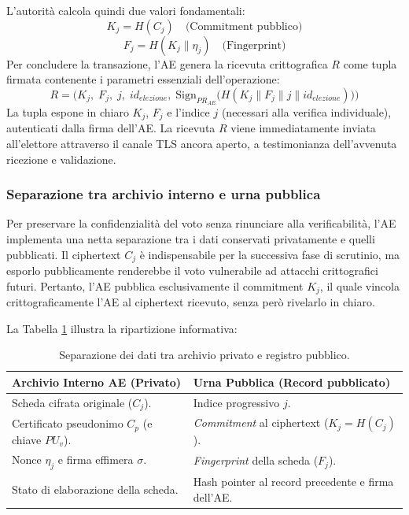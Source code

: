 L'autorità calcola quindi due valori fondamentali:
$$K_j = H(C_j) \quad \text{(Commitment pubblico)}$$
$$F_j = H(K_j \parallel \eta_j) \quad \text{(Fingerprint)}$$
Per concludere la transazione, l'AE genera la ricevuta crittografica $R$ come tupla firmata contenente i parametri essenziali dell'operazione:
$$R = \bigl(K_j,\; F_j,\; j,\; id_{elezione},\;
    \text{Sign}_{PR_{AE}}\!\bigl(H(K_j \parallel F_j \parallel j \parallel id_{elezione})\bigr)\bigr)$$
La tupla espone in chiaro $K_j$, $F_j$ e l'indice $j$ (necessari alla verifica individuale), autenticati dalla firma dell'AE. La ricevuta $R$ viene immediatamente inviata all'elettore attraverso il canale TLS ancora aperto, a testimonianza dell'avvenuta ricezione e validazione.

\subsubsection{Separazione tra archivio interno e urna pubblica}
\label{subsubsec:wp2_archivio_vs_urna}

Per preservare la confidenzialità del voto senza rinunciare alla verificabilità, l'AE implementa una netta separazione tra i dati conservati privatamente e quelli pubblicati. 
Il ciphertext $C_j$ è indispensabile per la successiva fase di scrutinio, ma esporlo pubblicamente renderebbe il voto vulnerabile ad attacchi crittografici futuri. Pertanto, l'AE pubblica esclusivamente il commitment $K_j$, il quale vincola crittograficamente l'AE al ciphertext ricevuto, senza però rivelarlo in chiaro.

La Tabella \ref{tab:separazione_dati} illustra la ripartizione informativa:

\begin{table}[H]
\centering
\renewcommand{\arraystretch}{1.3}
\begin{tabular}{|p{7cm}|p{7.5cm}|}
\hline
\textbf{Archivio Interno AE (Privato)} & \textbf{Urna Pubblica (Record pubblicato)} \\ \hline
Scheda cifrata originale ($C_j$). & Indice progressivo $j$. \\ \hline
Certificato pseudonimo $C_p$ (e chiave $PU_v$). & \textit{Commitment} al ciphertext ($K_j = H(C_j)$). \\ \hline
Nonce $\eta_j$ e firma effimera $\sigma$. & \textit{Fingerprint} della scheda ($F_j$). \\ \hline
Stato di elaborazione della scheda. & Hash pointer al record precedente e firma dell'AE. \\ \hline
\end{tabular}
\caption{Separazione dei dati tra archivio privato e registro pubblico.}
\label{tab:separazione_dati}
\end{table}

